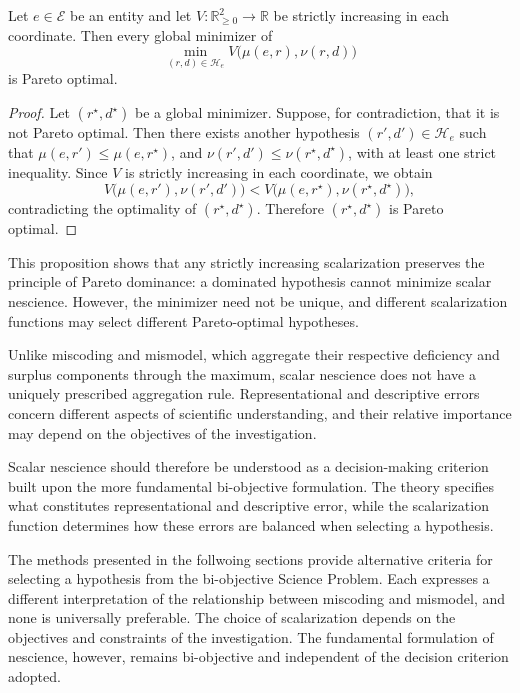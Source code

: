 \begin{proposition}
\label{prop:strictly_increasing_dm_pareto}
Let $e\in\mathcal E$ be an entity and let $V:\mathbb{R}_{\geq 0}^2\to\mathbb{R}$ be strictly increasing in each coordinate. Then every global minimizer of
\[
\min_{(r,d)\in\mathcal H_e} V\bigl(\mu(e,r),\nu(r,d)\bigr)
\]
is Pareto optimal.
\end{proposition}
\begin{proof}
Let $(r^\star,d^\star)$ be a global minimizer. Suppose, for contradiction, that it is not Pareto optimal. Then there exists another hypothesis $(r',d')\in\mathcal H_e$ such that $\mu(e,r')\leq\mu(e,r^\star)$, and $\nu(r',d')\leq\nu(r^\star,d^\star)$, with at least one strict inequality. Since $V$ is strictly increasing in each coordinate, we obtain
\[
V\bigl(\mu(e,r'),\nu(r',d')\bigr) < V\bigl(\mu(e,r^\star),\nu(r^\star,d^\star)\bigr),
\]
contradicting the optimality of $(r^\star,d^\star)$. Therefore $(r^\star,d^\star)$ is Pareto optimal.
\end{proof}

This proposition shows that any strictly increasing scalarization preserves the principle of Pareto dominance: a dominated hypothesis cannot minimize scalar nescience. However, the minimizer need not be unique, and different scalarization functions may select different Pareto-optimal hypotheses.

Unlike miscoding and mismodel, which aggregate their respective deficiency and surplus components through the maximum, scalar nescience does not have a uniquely prescribed aggregation rule. Representational and descriptive errors concern different aspects of scientific understanding, and their relative importance may depend on the objectives of the investigation.

Scalar nescience should therefore be understood as a decision-making criterion built upon the more fundamental bi-objective formulation. The theory specifies what constitutes representational and descriptive error, while the scalarization function determines how these errors are balanced when selecting a hypothesis.

The methods presented in the follwoing sections provide alternative criteria for selecting a hypothesis from the bi-objective Science Problem. Each expresses a different interpretation of the relationship between miscoding and mismodel, and none is universally preferable. The choice of scalarization depends on the objectives and constraints of the investigation. The fundamental formulation of nescience, however, remains bi-objective and independent of the decision criterion adopted.

